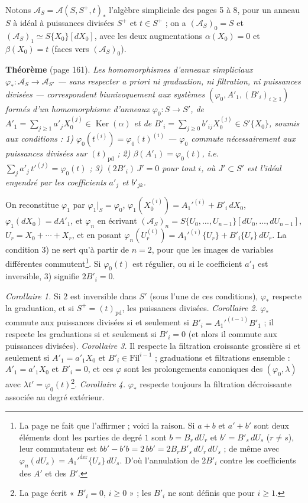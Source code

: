 \documentclass[11pt,a4paper]{article}
\begin{document}
Notons $\mathcal{A}_S = \mathcal{A}(S, S^+, t)_*$ l'algèbre simpliciale des
pages 5 à 8, pour un anneau $S$ à idéal à puissances divisées $S^+$ et $t \in
S^+$ ; on a $(\mathcal{A}_S)_0 = S$ et $(\mathcal{A}_S)_1 \simeq
S\{X_0\}[dX_0]$, avec les deux augmentations $\alpha(X_0) = 0$ et
$\beta(X_0) = t$ (faces vers $(\mathcal{A}_S)_0$).

\textbf{Théorème} (page 161). \emph{Les homomorphismes d'anneaux simpliciaux
$\varphi_* : \mathcal{A}_S \to \mathcal{A}_{S'}$ — sans respecter a priori ni
graduation, ni filtration, ni puissances divisées — correspondent
biunivoquement aux systèmes $(\varphi_0, A'_1, (B'_i)_{i \geq 1})$ formés d'un
homomorphisme d'anneaux $\varphi_0 : S \to S'$, de $A'_1 = \sum_{j \geq 1}
a'_j X_0^{(j)} \in \operatorname{Ker}(\alpha)$ et de $B'_i = \sum_{j \geq 0}
b'_{ij}X_0^{(j)} \in S'\{X_0\}$, soumis aux conditions :}
\emph{1) $\varphi_0(t^{(i)}) = \varphi_0(t)^{(i)}$ — $\varphi_0$ commute
nécessairement aux puissances divisées sur $(t)_{\mathrm{pd}}$ ;}
\emph{2) $\beta(A'_1) = \varphi_0(t)$, i.e.\ $\sum_j a'_j\, t'^{(j)} =
\varphi_0(t)$ ;}
\emph{3) $(2B'_i)\,J' = 0$ pour tout $i$, où $J' \subset S'$ est l'idéal
engendré par les coefficients $a'_j$ et $b'_{jk}$.}

On reconstitue $\varphi_1$ par $\varphi_1|_S = \varphi_0$,
$\varphi_1(X_0^{(i)}) = A_1'^{(i)} + B'_i\,dX_0$, $\varphi_1(dX_0) = dA'_1$, et
$\varphi_n$ en écrivant $(\mathcal{A}_S)_n = S\{U_0,\ldots,U_{n-1}\}[dU_0,
\ldots,dU_{n-1}]$, $U_r = X_0 + \cdots + X_r$, et en posant $\varphi_n(U_r^{(i)})
= A_1'^{(i)}\{U_r\} + B'_i\{U_r\}\,dU_r$. La condition 3) ne sert qu'à partir
de $n = 2$, pour que les images de variables différentes commutent\footnote{La
page ne fait que l'affirmer ; voici la raison. Si $a + b$ et $a' + b'$ sont deux
éléments dont les parties de degré $1$ sont $b = B_r\,dU_r$ et $b' = B'_s\,dU_s$
($r \neq s$), leur commutateur est $bb' - b'b = 2\,bb' = 2B_rB'_s\,dU_r\,dU_s$ ;
de même avec $\varphi_n(dU_s) = A_1'^{\mathrm{der}}\{U_s\}\,dU_s$. D'où
l'annulation de $2B'_i$ contre les coefficients des $A'$ et des $B'$.}.
Si $\varphi_0(t)$ est régulier, ou si le coefficient $a'_1$ est inversible, 3)
signifie $2B'_i = 0$.

\emph{Corollaire 1.} Si $2$ est inversible dans $S'$ (sous l'une de ces
conditions), $\varphi_*$ respecte la graduation, et si $S^+ =
(t)_{\mathrm{pd}}$, les puissances divisées.
\emph{Corollaire 2.} $\varphi_*$ commute aux puissances divisées si et
seulement si $B'_i = A_1'^{(i-1)}B'_1$ ; il respecte les graduations si et
seulement si $B'_i = 0$ (et alors il commute aux puissances divisées).
\emph{Corollaire 3.} Il respecte la filtration croissante grossière si et
seulement si $A'_1 = a'_1X_0$ et $B'_i \in \mathrm{Fil}^{i-1}$ ; graduations et
filtrations ensemble : $A'_1 = a'_1X_0$ et $B'_i = 0$, et ces $\varphi$ sont
les prolongements canoniques des $(\varphi_0, \lambda)$ avec
$\lambda t' = \varphi_0(t)$\footnote{La page écrit « $B'_i = 0$, $i \geq 0$ » ;
les $B'_i$ ne sont définis que pour $i \geq 1$.}.
\emph{Corollaire 4.} $\varphi_*$ respecte toujours la filtration décroissante
associée au degré extérieur.
\end{document}

